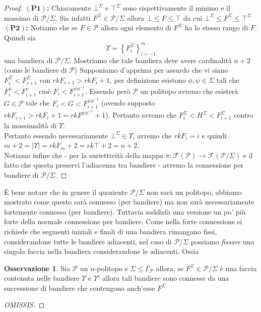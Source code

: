 \documentclass[a4paper,12pt]{report}
\newcommand{\p}{\mathcal{P}}
\theoremstyle{plain}
\theoremstyle{definition}
\newtheorem{oss}[teo]{Osservazione}
\newcommand\point[1]{$\bm{(#1)}$\textbf{: }}
\newcommand\flag[1]{\mathcal{F}(#1)}
\begin{document}
\begin{proof}
\point{P1}Chiaramente $\bot^\Sigma$ e $\top^\Sigma$ sono rispettivamente il minimo e il massimo di $\p/\Sigma$. Sia infatti $F^\Sigma\in\p/\Sigma$
allora $\bot\leq F\leq\top$ da cui $\bot^\Sigma\leq F^\Sigma\leq\top^\Sigma$
\point{P2}Notiamo che se $F\in\p$ allora ogni elemento di $F^\Sigma$ ha lo stesso rango di $F$. Quindi sia
\begin{equation*}
\Upsilon=\left\{F_i^\Sigma\right\}_{i=-1}^m
\end{equation*}
una bandiera di $\p/\Sigma$. Mostriamo che tale bandiera deve avere cardinalit\`a $n+2$ (come le bandiere di $\p$)
Supponiamo d'apprima per assurdo che vi siano $F_i^\Sigma<F_{i+1}^\Sigma$ con $rkF_{i+1}>rkF_i+1$, per definizione esistono $\phi,\psi\in\Sigma$
tali che $F_i^\phi<F_{i+1}^\psi$ cio\`e $F_i<F_{i+1}^{\psi\phi^{-1}}$. Essendo per\`o $\p$ un politopo avremo che esister\`a $G\in\p$ tale che
$F_i<G<F_{i+1}^{\psi\phi^{-1}}$ (avendo supposto $rkF_{i+1}>rkF_i+1=rkF^{\psi\phi^{-1}}+1$). Pertanto avremo che $F_i^\Sigma<H^\Sigma<F_{i+1}^\Sigma$
contro la massimalit\`a di $\Upsilon$.\\
Pertanto essendo necessariamente $\bot^\Sigma\in\Upsilon$, avremo che $rkF_i=i$ e quindi $m+2=\left|\Upsilon\right|=rkF_m+2=rk\top+2=n+2$.\\
Notiamo infine che - per la suriettivit\`a della mappa $\pi:\flag{\p}\longrightarrow\flag{\p/\Sigma}$ e il fatto che questa preservi l'adiacenza
tra bandiere - avremo la connessione per bandiere di $\p/\Sigma$.
\end{proof}
\`E bene notare che in genere il quoziente $\p/\Sigma$ non sar\`a un politopo, abbiamo mostrato come questo sar\`a connesso (per bandiere) ma non sar\`a
necessariamente fortemente connesso (per bandiere). Tuttavia soddisfa una versione un po' pi\`u forte della normale connessione per bandiere.
Come nella forte connessione si richiede che segmenti iniziali e finali di una bandiera rimangano fissi, considerandone tutte le bandiere adiacenti,
nel caso di $\p/\Sigma$ possiamo \emph{fissare} una singola faccia nella bandiera considerandone le adiacenti. Ossia
\begin{oss}
\label{oss:ConnectionFixingFace}
Sia $\p$ un $n$-politopo e $\Sigma\leq\Gamma_\p$ allora, se $F^\Sigma\in\p/\Sigma$ \`e una faccia contenuta nelle bandiere $\Upsilon$ e $\Upsilon'$
allora tali bandiere sono connesse da una successione di bandiere che contengono anch'esse $F^\Sigma$
\end{oss}
\begin{proof}
[OMISSIS]
\end{proof}
\end{document}
